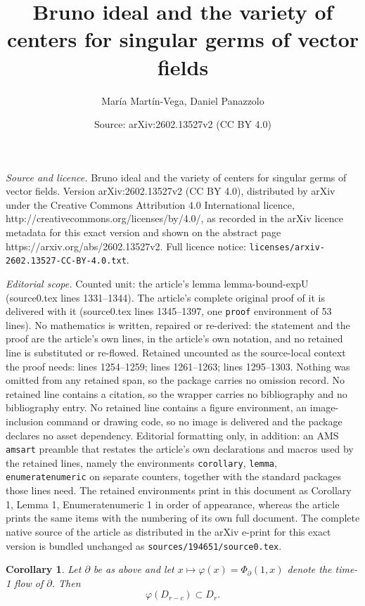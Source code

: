 \documentclass[10pt,a4paper]{amsart}
\title{Bruno ideal and the variety of centers for singular germs of vector fields}
\author{Mar\'ia Mart\'in-Vega, Daniel Panazzolo}
\date{Source: arXiv:2602.13527v2 (CC BY 4.0)}
\newtheorem{corollary}{Corollary}
\begin{document}
\maketitle

\noindent\emph{Source and licence.} Bruno ideal and the variety of centers for singular germs of vector fields. Version arXiv:2602.13527v2 (CC BY 4.0), distributed by arXiv under the Creative Commons Attribution 4.0 International licence, http://creativecommons.org/licenses/by/4.0/, as recorded in the arXiv licence metadata for this exact version and shown on the abstract page https://arxiv.org/abs/2602.13527v2. Full licence notice: \texttt{licenses/arxiv-2602.13527-CC-BY-4.0.txt}.\par\smallskip

\noindent\textit{Editorial scope.} Counted unit: the article's lemma lemma-bound-expU (source0.tex lines 1331--1344). The article's complete original proof of it is delivered with it (source0.tex lines 1345--1397, one \texttt{proof} environment of 53 lines). No mathematics is written, repaired or re-derived: the statement and the proof are the article's own lines, in the article's own notation, and no retained line is substituted or re-flowed.  Retained uncounted as the source-local context the proof needs: lines 1254--1259; lines 1261--1263; lines 1295--1303.  Nothing was omitted from any retained span, so the package carries no omission record.  No retained line contains a citation, so the wrapper carries no bibliography and no bibliography entry.  No retained line contains a figure environment, an image-inclusion command or drawing code, so no image is delivered and the package declares no asset dependency.  Editorial formatting only, in addition: an AMS \texttt{amsart} preamble that restates the article's own declarations and macros used by the retained lines, namely the environments \texttt{corollary}, \texttt{lemma}, \texttt{enumeratenumeric} on separate counters, together with the standard packages those lines need.  The retained environments print in this document as Corollary 1, Lemma 1, Enumeratenumeric 1 in order of appearance, whereas the article prints the same items with the numbering of its own full document.  The complete native source of the article as distributed in the arXiv e-print for this exact version is bundled unchanged as \texttt{sources/194651/source0.tex}.
\begin{corollary}\label{corollary-inclusion-of-disks}
Let $\partial$ be as above and let $x \mapsto \varphi(x) = \Phi_\partial(1,x)$ denote the time-1 flow of $\partial$. Then
\[
\varphi(D_{r-c}) \subset D_r.
\]
\end{corollary}
\end{document}

